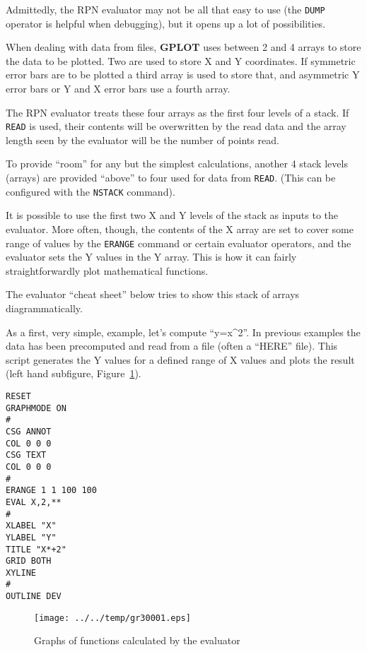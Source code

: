 \documentclass[a4paper,twoside,11pt]{article}
\makeatletter
\def\maxwidth{%
  \ifdim\Gin@nat@width>\linewidth
    \linewidth
  \else
    \Gin@nat@width
  \fi
}
\newcommand{\newpara}{\par\vspace{4mm}\noindent}
\makeatother
\begin{document}
\newpara
Admittedly, the RPN evaluator may not be all that easy to use (the
\texttt{DUMP} operator is helpful when debugging), but it opens up a lot
of possibilities.

\newpara
When dealing with data from files, \textbf{GPLOT} uses between 2 and 4 arrays to
store the data to be plotted. Two are used to store X and Y coordinates.
If symmetric error bars are to be plotted a third array is used to store
that, and asymmetric Y error bars or Y and X error bars use a fourth
array.

\newpara
The RPN evaluator treats these four arrays as the first four levels of a
stack. If \texttt{READ} is used, their contents will be overwritten by
the read data and the array length seen by the evaluator will be the
number of points read.

\newpara
To provide ``room'' for any but the simplest calculations, another 4
stack levels (arrays) are provided ``above'' to four used for data from
\texttt{READ}. (This can be configured with the \texttt{NSTACK}
command).

\newpara
It is possible to use the first two X and Y levels of the stack as
inputs to the evaluator. More often, though, the contents of the X array
are set to cover some range of values by the \texttt{ERANGE} command or
certain evaluator operators, and the evaluator sets the Y values in the
Y array. This is how it can fairly straightforwardly plot mathematical
functions.

\newpara
The evaluator ``cheat sheet'' below tries to show this stack of arrays
diagrammatically.

\newpara
As a first, very simple, example, let's compute ``y=x\^{}2''. In
previous examples the data has been precomputed and read from a file
(often a ``HERE'' file). This script generates the Y values for a
defined range of X values and plots the result (left hand subfigure,
Figure~\ref{fig:gr30001}).

\begin{lstlisting}
RESET
GRAPHMODE ON
#
CSG ANNOT
COL 0 0 0
CSG TEXT
COL 0 0 0
#
ERANGE 1 1 100 100
EVAL X,2,**
#
XLABEL "X"
YLABEL "Y"
TITLE "X*+2"
GRID BOTH
XYLINE
#
OUTLINE DEV
\end{lstlisting}

\begin{figure}
  \centering
  \texttt{[image: ../../temp/gr30001.eps]}
  \caption{Graphs of functions calculated by the evaluator}
  \label{fig:gr30001}
\end{figure}
\end{document}
